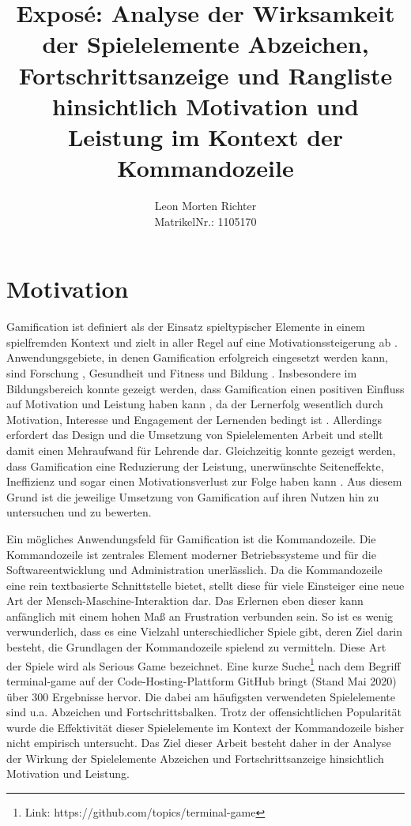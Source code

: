 \documentclass[
    a4paper,
    doc,
    12pt,
    natbib,
]{apa6}
\title{Exposé: Analyse der Wirksamkeit  der Spielelemente Abzeichen, Fortschrittsanzeige und Rangliste hinsichtlich Motivation und Leistung im Kontext der Kommandozeile}
\author{Leon Morten Richter\\MatrikelNr.: 1105170}
\affiliation{Christian-Albrechts-Universität zu Kiel}
\begin{document}
\maketitle

\section{Motivation}
Gamification ist definiert als der Einsatz spieltypischer Elemente in einem spielfremden Kontext \citep{deterding_game_2011} und zielt in aller Regel auf eine Motivationssteigerung ab \citep{takahashi_gamification_2010}. Anwendungsgebiete, in denen Gamification erfolgreich eingesetzt werden kann, sind Forschung \citep{brauer_erhohung_2019}, Gesundheit und Fitness \citep{johnson_gamification_2016} und Bildung \citep{de_freitas_prepared_2006}. Insbesondere im Bildungsbereich konnte gezeigt werden, dass Gamification einen positiven Einfluss auf Motivation und Leistung haben kann \citep{ibanez_gamification_2014}, da der Lernerfolg wesentlich durch Motivation, Interesse und Engagement der Lernenden bedingt ist \citep{astin_student_1984}. Allerdings erfordert das Design und die Umsetzung von Spielelementen Arbeit und stellt damit einen Mehraufwand für Lehrende dar. Gleichzeitig konnte gezeigt werden, dass Gamification eine Reduzierung der Leistung, unerwünschte Seiteneffekte, Ineffizienz und sogar einen Motivationsverlust zur Folge haben kann \citep{toda_dark_2018}. Aus diesem Grund ist die jeweilige Umsetzung von Gamification auf ihren Nutzen hin zu untersuchen und zu bewerten.

Ein mögliches Anwendungsfeld für Gamification ist die Kommandozeile.
Die Kommandozeile ist zentrales Element moderner Betriebssysteme und für die Softwareentwicklung und Administration unerlässlich. Da die Kommandozeile eine rein textbasierte Schnittstelle bietet, stellt diese für viele Einsteiger eine neue Art der Mensch-Maschine-Interaktion dar. Das Erlernen eben dieser kann anfänglich mit einem hohen Maß an Frustration verbunden sein. So ist es wenig verwunderlich, dass es eine Vielzahl unterschiedlicher Spiele gibt, deren Ziel darin besteht, die Grundlagen der Kommandozeile spielend zu vermitteln. Diese Art der Spiele wird als Serious Game bezeichnet. Eine kurze Suche\footnote{Link: https://github.com/topics/terminal-game} nach dem Begriff \glqq terminal-game\grqq{} auf der Code-Hosting-Plattform GitHub bringt (Stand Mai 2020) über 300 Ergebnisse hervor. Die dabei am häufigsten verwendeten Spielelemente sind u.a. Abzeichen und Fortschrittsbalken.
Trotz der offensichtlichen Popularität wurde die Effektivität dieser Spielelemente im Kontext der Kommandozeile bisher nicht empirisch untersucht. Das Ziel dieser Arbeit besteht daher in der Analyse der Wirkung der Spielelemente Abzeichen und Fortschrittsanzeige hinsichtlich Motivation und Leistung.
\end{document}
